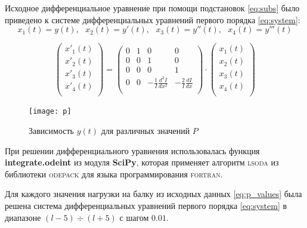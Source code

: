 Исходное дифференциальное уравнение при помощи подстановок \ref{eq:subs} было приведено к системе дифференциальных уравнений первого порядка \ref{eq:system}:
\begin{equation}\label{eq:subs}
x_1(t) = y(t),\ \ \ x_2(t) = y'(t),\ \ \ x_3(t) = y''(t),\ \ \ x_4(t) = y'''(t)
\end{equation}

\begin{equation}\label{eq:system}
\begin{pmatrix}
    x'_1(t) \\
    x'_2(t) \\
    x'_3(t) \\
    x'_4(t) \\
\end{pmatrix} =
\begin{pmatrix}
    0 & 1 & 0 & 0 \\
    0 & 0 & 1 & 0 \\
    0 & 0 & 0 & 1 \\
    0 & 0 & - \frac{1}{I} \frac{d^2I}{dx^2} & - \frac{2}{I} \frac{dI}{dx} \\
\end{pmatrix}
\cdot
\begin{pmatrix}
    x_1(t) \\
    x_2(t) \\
    x_3(t) \\
    x_4(t) \\
\end{pmatrix}
\end{equation}

\begin{figure}[H]
\begin{center}
	\vspace{-0.5cm}
	\texttt{[image: p]}
	\caption{Зависимость $y(t)$ для различных значений $P$}
	\label{plt:p}
	\vspace{-0.5cm}
\end{center}
\end{figure}

При решении дифференциального уравнения использовалась функция \textbf{integrate.odeint} из модуля \textbf{SciPy}, которая применяет алгоритм \textsc{lsoda} из библиотеки \textsc{odepack} для языка программирования \textsc{fortran}.

Для каждого значения нагрузки на балку из исходных данных \ref{eq:p_values} была решена система дифференциальных уравнений первого порядка \ref{eq:system} в диапазоне $(l-5) \div (l+5)$ с шагом $0.01$.

